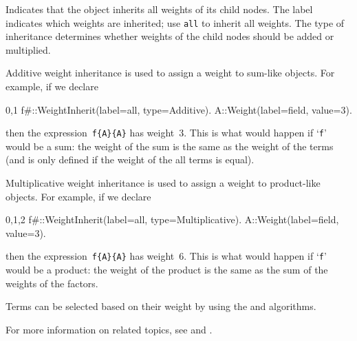 
Indicates that the object inherits all weights of its child nodes. The
label indicates which weights are inherited; use {\tt all} to inherit
all weights. The type of inheritance determines whether weights of the
child nodes should be added or multiplied. 

Additive weight inheritance is used to assign a weight to sum-like
objects. For example, if we declare
\begin{screen}{0,1}
f{#}::WeightInherit(label=all, type=Additive).
A::Weight(label=field, value=3).
\end{screen}
then the expression~\verb|f{A}{A}| has weight~3. This is what would
happen if `\verb|f|' would be a sum: the weight of the sum is the same
as the weight of the terms (and is only defined if the weight of the
all terms is equal).

Multiplicative weight inheritance is used to assign a weight to 
product-like objects. For example, if we declare
\begin{screen}{0,1,2}
f{#}::WeightInherit(label=all, type=Multiplicative).
A::Weight(label=field, value=3).
\end{screen}
then the expression~\verb|f{A}{A}| has weight~6. This is what would
happen if `\verb|f|' would be a product: the weight of the product is the same
as the sum of the weights of the factors.

Terms can be selected based on their weight by using the
 and  algorithms.

For more information on related topics, see 
and .



